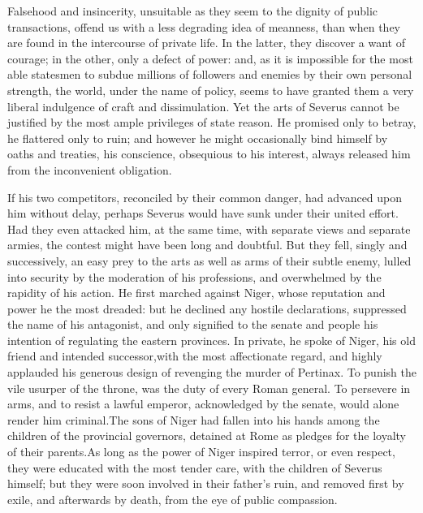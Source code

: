 
Falsehood and insincerity, unsuitable as they seem to the dignity
of public transactions, offend us with a less degrading idea of
meanness, than when they are found in the intercourse of private
life. In the latter, they discover a want of courage; in the
other, only a defect of power: and, as it is impossible for the
most able statesmen to subdue millions of followers and enemies
by their own personal strength, the world, under the name of
policy, seems to have granted them a very liberal indulgence of
craft and dissimulation. Yet the arts of Severus cannot be
justified by the most ample privileges of state reason. He
promised only to betray, he flattered only to ruin; and however
he might occasionally bind himself by oaths and treaties, his
conscience, obsequious to his interest, always released him from
the inconvenient obligation.\footnotemark[43]


If his two competitors, reconciled by their common danger, had
advanced upon him without delay, perhaps Severus would have sunk
under their united effort. Had they even attacked him, at the
same time, with separate views and separate armies, the contest
might have been long and doubtful. But they fell, singly and
successively, an easy prey to the arts as well as arms of their
subtle enemy, lulled into security by the moderation of his
professions, and overwhelmed by the rapidity of his action. He
first marched against Niger, whose reputation and power he the
most dreaded: but he declined any hostile declarations,
suppressed the name of his antagonist, and only signified to the
senate and people his intention of regulating the eastern
provinces. In private, he spoke of Niger, his old friend and
intended successor,\footnotemark[44] with the most affectionate regard, and
highly applauded his generous design of revenging the murder of
Pertinax. To punish the vile usurper of the throne, was the duty
of every Roman general. To persevere in arms, and to resist a
lawful emperor, acknowledged by the senate, would alone render
him criminal.\footnotemark[45] The sons of Niger had fallen into his hands
among the children of the provincial governors, detained at Rome
as pledges for the loyalty of their parents.\footnotemark[46] As long as the
power of Niger inspired terror, or even respect, they were
educated with the most tender care, with the children of Severus
himself; but they were soon involved in their father’s ruin, and
removed first by exile, and afterwards by death, from the eye of
public compassion.\footnotemark[47]

